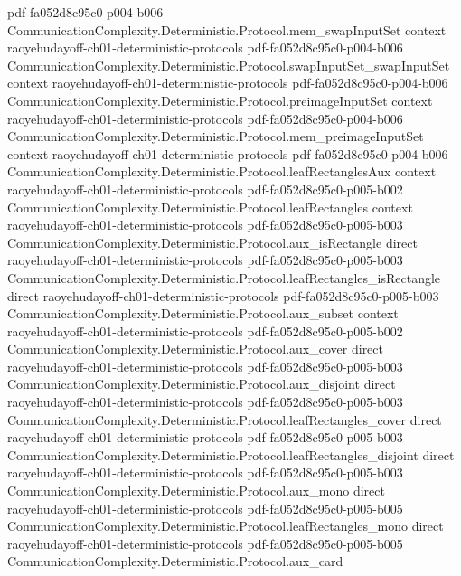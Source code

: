 \begin{theorem}
  {pdf-fa052d8c95c0-p004-b006}
\proofstep
  {CommunicationComplexity.Deterministic.Protocol.mem_swapInputSet}
  {context}
  {raoyehudayoff-ch01-deterministic-protocols}
  {pdf-fa052d8c95c0-p004-b006}
\proofstep
  {CommunicationComplexity.Deterministic.Protocol.swapInputSet_swapInputSet}
  {context}
  {raoyehudayoff-ch01-deterministic-protocols}
  {pdf-fa052d8c95c0-p004-b006}
\proofstep
  {CommunicationComplexity.Deterministic.Protocol.preimageInputSet}
  {context}
  {raoyehudayoff-ch01-deterministic-protocols}
  {pdf-fa052d8c95c0-p004-b006}
\proofstep
  {CommunicationComplexity.Deterministic.Protocol.mem_preimageInputSet}
  {context}
  {raoyehudayoff-ch01-deterministic-protocols}
  {pdf-fa052d8c95c0-p004-b006}
\proofstep
  {CommunicationComplexity.Deterministic.Protocol.leafRectanglesAux}
  {context}
  {raoyehudayoff-ch01-deterministic-protocols}
  {pdf-fa052d8c95c0-p005-b002}
\proofstep
  {CommunicationComplexity.Deterministic.Protocol.leafRectangles}
  {context}
  {raoyehudayoff-ch01-deterministic-protocols}
  {pdf-fa052d8c95c0-p005-b003}
\proofstep
  {CommunicationComplexity.Deterministic.Protocol.aux_isRectangle}
  {direct}
  {raoyehudayoff-ch01-deterministic-protocols}
  {pdf-fa052d8c95c0-p005-b003}
\proofstep
  {CommunicationComplexity.Deterministic.Protocol.leafRectangles_isRectangle}
  {direct}
  {raoyehudayoff-ch01-deterministic-protocols}
  {pdf-fa052d8c95c0-p005-b003}
\proofstep
  {CommunicationComplexity.Deterministic.Protocol.aux_subset}
  {context}
  {raoyehudayoff-ch01-deterministic-protocols}
  {pdf-fa052d8c95c0-p005-b002}
\proofstep
  {CommunicationComplexity.Deterministic.Protocol.aux_cover}
  {direct}
  {raoyehudayoff-ch01-deterministic-protocols}
  {pdf-fa052d8c95c0-p005-b003}
\proofstep
  {CommunicationComplexity.Deterministic.Protocol.aux_disjoint}
  {direct}
  {raoyehudayoff-ch01-deterministic-protocols}
  {pdf-fa052d8c95c0-p005-b003}
\proofstep
  {CommunicationComplexity.Deterministic.Protocol.leafRectangles_cover}
  {direct}
  {raoyehudayoff-ch01-deterministic-protocols}
  {pdf-fa052d8c95c0-p005-b003}
\proofstep
  {CommunicationComplexity.Deterministic.Protocol.leafRectangles_disjoint}
  {direct}
  {raoyehudayoff-ch01-deterministic-protocols}
  {pdf-fa052d8c95c0-p005-b003}
\proofstep
  {CommunicationComplexity.Deterministic.Protocol.aux_mono}
  {direct}
  {raoyehudayoff-ch01-deterministic-protocols}
  {pdf-fa052d8c95c0-p005-b005}
\proofstep
  {CommunicationComplexity.Deterministic.Protocol.leafRectangles_mono}
  {direct}
  {raoyehudayoff-ch01-deterministic-protocols}
  {pdf-fa052d8c95c0-p005-b005}
\proofstep
  {CommunicationComplexity.Deterministic.Protocol.aux_card}

\end{theorem}
